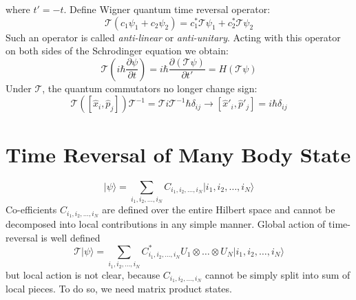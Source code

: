 \documentclass[a0,portrait]{a0poster}
\newcommand{\mc}[1]{\mathcal{#1}}
\newcommand{\ket}[1]{\vert #1 \rangle}
\begin{document}
\begin{multicols}{2}
where $ t' = -t $. Define Wigner quantum time reversal operator:
\begin{equation}\label{eqn:wigner-time-reversal}
	\mc{T} ( c_1 \psi_1 + c_2 \psi_2 ) = c_1^* \mc{T} \psi_1 + c_2^* \mc{T} \psi_2
\end{equation}
Such an operator is called \emph{anti-linear} or \emph{anti-unitary}. Acting with this operator on both sides of the Schrodinger equation we obtain:
\begin{equation}\label{eqn:trs-schrodinger-2}
	\mc{T} \left( i \hbar \frac{\partial \psi}{\partial t} \right) = i \hbar \frac{\partial (\mc{T} \psi)}{\partial t'} = H (\mc{T} \psi)
\end{equation}
Under $ \mc{T} $, the quantum commutators no longer change sign:
\begin{equation}\label{eqn:quantum-poisson-2}
	\mc{T} \left(\left[ \hat{x}_i, \hat{p}_j \right]\right) \mc{T}^{-1} = \mc{T} i \mc{T}^{-1} \hbar \delta_{ij} \rightarrow \left[\hat{x}'_i, \hat{p}'_j \right]= i \hbar \delta_{ij}
\end{equation}


\vspace*{-1cm}



\color{DarkGreen}


\section*{Time Reversal of Many Body State}

\begin{equation}\label{eqn:many-body-state}
	\ket{\psi} = \sum_{i_1, i_2, \ldots, i_N} C_{i_1, i_2, \ldots, i_N} \ket{i_1, i_2, \ldots, i_N}
\end{equation}
Co-efficients $  C_{i_1, i_2, \ldots, i_N} $ are defined over the entire Hilbert space and cannot be decomposed into local contributions in any simple manner. Global action of time-reversal is well defined
\begin{equation}\label{eqn:trs-many-body-state}
	\mc{T} \ket{\psi} = \sum_{i_1, i_2, \ldots, i_N} C^*_{i_1, i_2, \ldots, i_N} U_1 \otimes \ldots \otimes U_N \ket{i_1, i_2, \ldots, i_N}
\end{equation}
but local action is not clear, because $ C_{i_1, i_2, \ldots, i_N} $ cannot be simply split into sum of local pieces. To do so, we need matrix product states.


\end{multicols}
\end{document}
